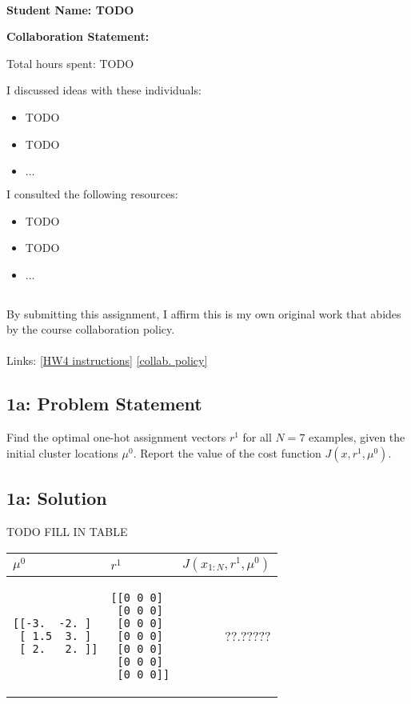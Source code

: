 \documentclass[10pt]{article}
\newcommand{\officialdirections}[1]{{\color{purple} #1}}
\begin{document}
~~\\ %

{\Large{\bf Student Name: TODO}}

\Large{\bf Collaboration Statement:}

Total hours spent: TODO

I discussed ideas with these individuals:
\begin{itemize}
\item TODO
\item TODO
\item $\ldots$	
\end{itemize}

I consulted the following resources:
\begin{itemize}
\item TODO
\item TODO
\item $\ldots$	
\end{itemize}
~~\\
By submitting this assignment, I affirm this is my own original work that abides by the course collaboration policy.
~~\\
~~\\
Links: 
\href{https://www.cs.tufts.edu/cs/136/2023s/hw4.html}{[HW4 instructions]} 
\href{https://www.cs.tufts.edu/cs/136/2023s/index.html#collaboration}{[collab. policy]} 

\tableofcontents

\newpage

\officialdirections{
\subsection*{1a: Problem Statement}
Find the optimal one-hot assignment vectors $r^1$ for all $N=7$ examples, given the initial cluster locations $\mu^0$. Report the value of the cost function $J(x, r^1, \mu^0)$.
}

\subsection{1a: Solution}
TODO FILL IN TABLE

\begin{tabular}{p{5cm} | p{5cm} | r}
$\mu^0$ & $r^1$ & $J(x_{1:N}, r^1, \mu^0)$
\\
\midrule
\begin{verbatim}
[[-3.  -2. ]
 [ 1.5  3. ]
 [ 2.   2. ]]
\end{verbatim}
&	
\begin{verbatim}
[[0 0 0]
 [0 0 0]
 [0 0 0]
 [0 0 0]
 [0 0 0]
 [0 0 0]
 [0 0 0]]
\end{verbatim}
&
 ??.?????
\end{tabular}
\end{document}
